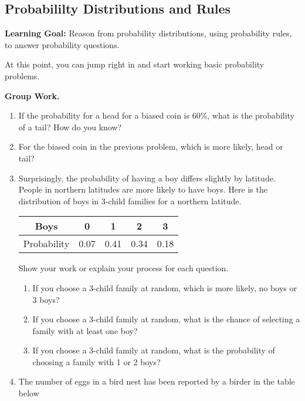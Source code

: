 \cleardoublepage
\subsection{Probabililty Distributions and Rules}
\textbf{Learning Goal:} Reason from probability distributions, using probability rules, to answer probability questions.

At this point, you can jump right in and start working basic probability problems.

\textbf{Group Work.}
\begin{enumerate}
\item If the probability for a head for a biased coin is 60\%, what is the probability of a tail? How do you know?\\[.5in]
\item For the biased coin in the previous problem, which is more likely, head or tail?\\[.5in]
\item Surprisingly, the probability of having a boy differs slightly by latitude. People in northern latitudes are more likely to have boys. Here is the distribution of boys in 3-child families for a northern latitude.

\begin{table}[H]\centering
\begin{tabular}{|c|c|c|c|c|} \hline
Boys & 0 & 1 & 2 & 3 \\
\hline
Probability&0.07& 0.41 & 0.34 & 0.18 \\
\hline
\end{tabular}
\end{table}

Show your work or explain your process for each question.
\begin{enumerate}
\item If you choose a 3-child family at random, which is more likely, no boys or 3 boys?\\[.5in]
\item If you choose a 3-child family at random, what is the chance of selecting a family with at least one boy?\\[.5in]
\item If you choose a 3-child family at random, what is the probability of choosing a family with 1 or 2 boys?\\[.5in]
\end{enumerate}
\item The number of eggs in a bird nest has been reported by a birder in the table below


\end{enumerate}
